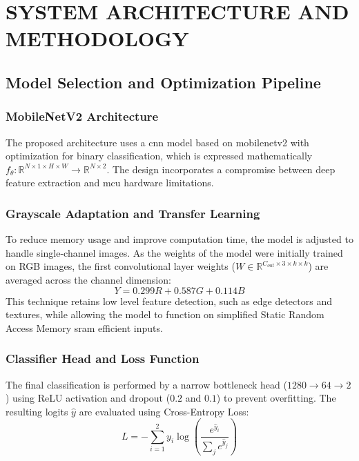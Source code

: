 \chapter{SYSTEM ARCHITECTURE AND METHODOLOGY}
\section{Model Selection and Optimization Pipeline}
\subsection{MobileNetV2 Architecture}
The proposed architecture uses a \gls{cnn} model based on mobilenetv2 with optimization for binary classification, which is expressed mathematically $f_{\theta} : \mathbb{R}^{N \times 1 \times H \times W} \to \mathbb{R}^{N \times 2}$. The design incorporates a compromise between deep feature extraction and \gls{mcu} hardware limitations.

\subsection*{Grayscale Adaptation and Transfer Learning}
To reduce memory usage and improve computation time, the model is adjusted to handle single-channel images. As the weights of the model were initially trained on RGB images, the first convolutional layer weights ($W \in \mathbb{R}^{C_{out} \times 3 \times k \times k}$) are averaged across the channel dimension:
\begin{equation}
    \label{eq:greyscale}
    Y = 0.299R + 0.587G + 0.114B
\end{equation}
This technique retains low level feature detection, such as edge detectors and textures, while allowing the model to function on simplified Static Random Access Memory \gls{sram} efficient inputs.

\subsection*{Classifier Head and Loss Function}
The final classification is performed by a narrow bottleneck head ($1280 \to 64 \to 2$) using ReLU activation and dropout ($0.2$ and $0.1$) to prevent overfitting. The resulting logits $\hat{y}$ are evaluated using Cross-Entropy Loss:
\begin{equation} L = - \sum_{i=1}^{2} y_i \log \left( \frac{e^{\hat{y}_i}}{\sum_{j} e^{\hat{y}_j}} \right) \end{equation}

